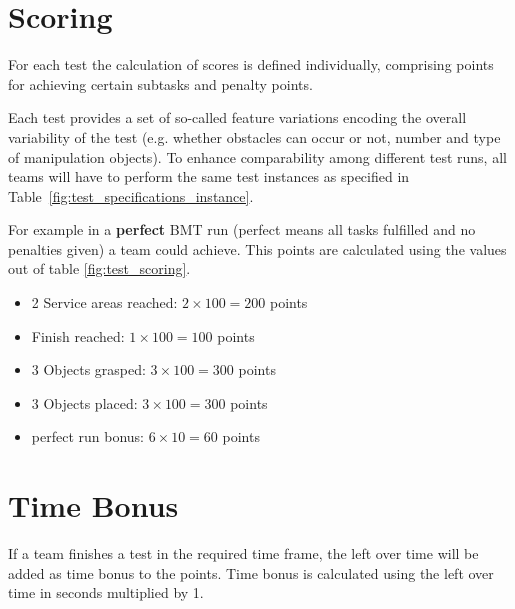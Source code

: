 \section{Scoring} \label{sec:ScoringAndRanking}

For each test the calculation of scores is defined individually, comprising points for achieving certain subtasks and penalty points.

Each test provides a set of so-called feature variations encoding the overall variability of the test (e.g. whether
obstacles can occur or not, number and type of manipulation objects). To enhance comparability among different test
runs, all teams will have to perform the same test instances as specified in Table~\ref{fig:test_specifications_instance}.

For example in a \textbf{perfect} BMT run (perfect means all tasks fulfilled and no penalties given) a team could achieve. This points are calculated using the values out of table \ref{fig:test_scoring}.

\begin{itemize}
	\item 2 Service areas reached: $2 \times 100 = 200$ points
	\item Finish reached: $1 \times 100 = 100 $ points
	\item 3 Objects grasped: $3 \times 100 = 300 $ points
	\item 3 Objects placed: $3 \times 100 = 300  $ points
	\item perfect run bonus: $6 \times 10 = 60 $ points
\end{itemize}


\section{Time Bonus}
If a team finishes a test in the required time frame, the left over time will be added as time bonus to the points. 
Time bonus is calculated using the left over time in seconds multiplied by 1. 


